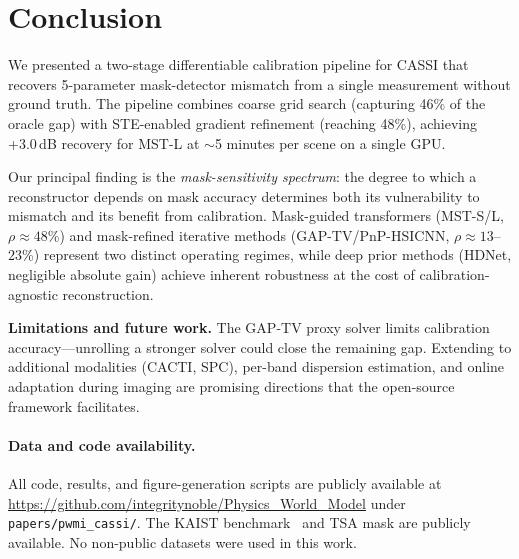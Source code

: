\documentclass[runningheads]{llncs}
\begin{document}
\section{Conclusion}
\label{sec:conclusion}

We presented a two-stage differentiable calibration pipeline for CASSI that recovers 5-parameter mask-detector mismatch from a single measurement without ground truth.
The pipeline combines coarse grid search (capturing 46\% of the oracle gap) with STE-enabled gradient refinement (reaching 48\%), achieving +3.0\,dB recovery for MST-L at $\sim$5 minutes per scene on a single GPU.

Our principal finding is the \emph{mask-sensitivity spectrum}: the degree to which a reconstructor depends on mask accuracy determines both its vulnerability to mismatch and its benefit from calibration.
Mask-guided transformers (MST-S/L, $\rho \approx 48$\%) and mask-refined iterative methods (GAP-TV/PnP-HSICNN, $\rho \approx 13$--$23$\%) represent two distinct operating regimes, while deep prior methods (HDNet, negligible absolute gain) achieve inherent robustness at the cost of calibration-agnostic reconstruction.

\textbf{Limitations and future work.}
The GAP-TV proxy solver limits calibration accuracy---unrolling a stronger solver could close the remaining gap.
Extending to additional modalities (CACTI, SPC), per-band dispersion estimation, and online adaptation during imaging are promising directions that the open-source framework facilitates.

\paragraph{Data and code availability.}
All code, results, and figure-generation scripts are publicly available at \url{https://github.com/integritynoble/Physics_World_Model} under \texttt{papers/pwmi\_cassi/}.
The KAIST benchmark~\cite{choi2017kaist} and TSA mask are publicly available.
No non-public datasets were used in this work.



\end{document}
